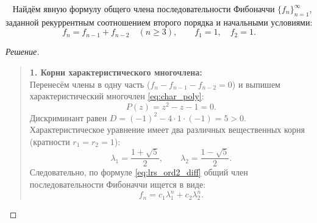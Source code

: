 \begin{example} ~
    Найдём явную формулу общего члена последовательности Фибоначчи 
    $\{f_n\}_{n=1}^\infty$, заданной рекуррентным соотношением второго 
    порядка и начальными условиями:
    \[
        f_n = f_{n-1} + f_{n-2} \quad (n \ge 3), \qquad f_1 = 1, \quad f_2 = 1.
    \]

    \begin{proof}[Решение]~\\
        \begin{quote}
            \textbf{1. Корни характеристического многочлена:}\\
            Перенесём члены в одну часть ($f_n - f_{n-1} - f_{n-2} = 0$) и 
            выпишем характеристический многочлен \eqref{eq:char_poly}:
            \[
                P(z) = z^2 - z - 1 = 0.
            \]
            Дискриминант равен $D = (-1)^2 - 4 \cdot 1 \cdot (-1) = 5 > 0$. 
            Характеристическое уравнение имеет два различных вещественных 
            корня (кратности $r_1 = r_2 = 1$):
            \[
                \lambda_1 = \frac{1 + \sqrt{5}}{2}, \qquad
                \lambda_2 = \frac{1 - \sqrt{5}}{2}.
            \]
            Следовательно, по формуле \eqref{eq:lrs_ord2_diff} общий член 
            последовательности Фибоначчи ищется в виде:
            \[
                f_n = c_1 \lambda_1^n + c_2 \lambda_2^n.
            \]


\end{quote}
\end{proof}
\end{example}
